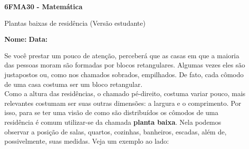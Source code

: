 \documentclass[a4paper,14pt]{article}
\begin{document}
	
	\noindent\textbf{6FMA30 - Matemática} 
	
	\begin{center}Plantas baixas de residência (Versão estudante)
	\end{center}
	
	\noindent\textbf{Nome:} \underline{\hspace{10cm}}
	\noindent\textbf{Data:} \underline{\hspace{4cm}}
	
	
	\begin{multicols}{2}
		\noindent Se você prestar um pouco de atenção, perceberá que as casas em que a maioria das pessoas moram são formadas por blocos retangulares. Algumas vezes eles são justapostos ou, como nos chamados sobrados, empilhados. De fato, cada cômodo de uma casa costuma ser um bloco retangular. \\
		Como a altura das residências, o chamado pé-direito, costuma variar pouco, mais relevantes costumam ser suas outras dimensões: a largura e o comprimento. Por isso, para se ter uma visão de como são distribuídos os cômodos de uma residência é comum utilizar-se da chamada \textbf{planta baixa}. Nela podemos observar a posição de salas, quartos, cozinhas, banheiros, escadas, além de, possivelmente, suas medidas. Veja um exemplo ao lado: \\

\end{multicols}
\end{document}
